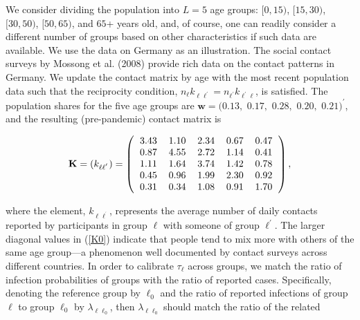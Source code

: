 \documentclass[12pt]{article}
\begin{document}
We consider dividing the population into $L=5$ age groups: $[0,15)$,
$[15,30)$, $[30,50)$, $[50,65)$, and $65$+ years old, and, of course, one can
readily consider a different number of groups based on other characteristics
if such data are available. We use the data on Germany as an illustration. The
social contact surveys by Mossong et al. (2008) provide rich data on the
contact patterns in Germany. We update the contact matrix by age with the most
recent population data such that the reciprocity condition, $n_{\ell}%
k_{\ell\ell^{\prime}}=n_{\ell^{\prime}}k_{\ell^{\prime}\ell}$, is satisfied.
The population shares for the five age groups are $\mathbf{w}=(0.13,$ $0.17,$
$0.28,$ $0.20,$ $0.21)^{\prime}$, and the resulting (pre-pandemic) contact
matrix is
\begin{footnotesize}
\begin{equation}
\mathbf{K}=\left(  k_{\ell\ell^{^{\prime}}}\right)  =\left(
\begin{tabular}
[c]{rrrrr}%
3.43 & 1.10 & 2.34 & 0.67 & 0.47\\
0.87 & 4.55 & 2.72 & 1.14 & 0.41\\
1.11 & 1.64 & 3.74 & 1.42 & 0.78\\
0.45 & 0.96 & 1.99 & 2.30 & 0.92\\
0.31 & 0.34 & 1.08 & 0.91 & 1.70
\end{tabular}
\right)  ,\label{K0}%
\end{equation}%
\end{footnotesize}%
where the element, $k_{\ell\ell^{^{\prime}}}$, represents the average number
of daily contacts reported by participants in group $\ell$ with someone of
group $\ell^{\prime}$. The larger diagonal values in (\ref{K0}) indicate that
people tend to mix more with others of the same age group---a phenomenon well
documented by contact surveys across different countries. In order to
calibrate $\tau_{\ell}$ across groups, we match the ratio of infection
probabilities of groups with the ratio of reported cases. Specifically,
denoting the reference group by $\ell_{0}$ and the ratio of reported
infections of group $\ell$ to group $\ell_{0}$ by $\lambda_{\ell\ell_{0}}$,
then $\lambda_{\ell\ell_{0}}$ should match the ratio of the related
\end{document}
